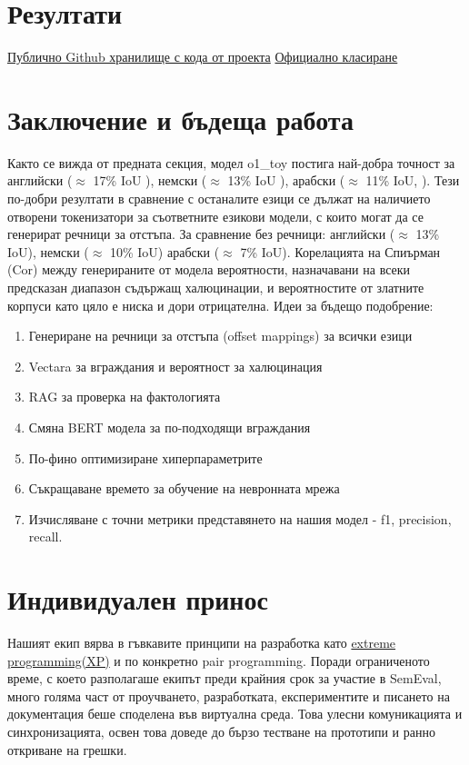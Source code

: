 \documentclass[12pt]{article}
\begin{document}
	\section{Резултати}
	
	\href{https://github.com/Kr1s1m/SemEval-2025_Task-3/}{Публично Github хранилище с кода от проекта} 
	\href{https://mushroomeval.pythonanywhere.com/submission/}{Официално класиране}
	
	\section{Заключение и бъдеща работа}
	
	Както се вижда от предната секция, модел o1\_toy постига най-добра точност за английски ($\approx$ 17\% IoU ), немски ($\approx$ 13\% IoU ), арабски ($\approx$ 11\% IoU, ). Тези по-добри резултати в сравнение с останалите езици се дължат на наличието отворени токенизатори за съответните езикови модели, с които могат да се генерират речници за отстъпа. За сравнение без речници: английски ($\approx$ 13\% IoU), немски ($\approx$ 10\% IoU) арабски ($\approx$ 7\% IoU). Корелацията на Спиърман (Cor) между генерираните от модела вероятности, назначавани на всеки предсказан диапазон съдържащ халюцинации, и вероятностите от златните корпуси като цяло е ниска и дори отрицателна.
	\newline\newline Идеи за бъдещо подобрение:
	
	\begin{enumerate}    
		\item[\textbullet] Генериране на речници за отстъпа (offset mappings) за всички езици
		\item[\textbullet] Vectara за вграждания и вероятност за халюцинация
		\item[\textbullet] RAG за проверка на фактологията
		\item[\textbullet] Смяна BERT модела за по-подходящи вграждания
		\item[\textbullet] По-фино оптимизиране хиперпараметрите
		\item[\textbullet] Съкращаване времето за обучение на невронната мрежа
		\item[\textbullet] Изчисляване с точни метрики представянето на нашия модел - f1, precision, recall.

	\end{enumerate}

	\section{Индивидуален принос}
	
	Нашият екип вярва в гъвкавите принципи на разработка като  \href{https://asana.com/resources/extreme-programming-xp}{extreme programming(XP)} и по конкретно pair programming. Поради ограниченото време, с което разполагаше екипът преди крайния срок за участие в SemEval, много голяма част от проучването, разработката, експериментите и писането на документация беше споделена във виртуална среда. Това улесни комуникацията и синхронизацията, освен това доведе до бързо тестване на прототипи и ранно откриване на грешки.
	
\end{document}
